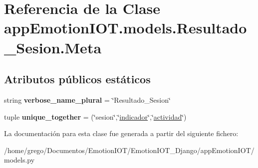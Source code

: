 \hypertarget{classappEmotionIOT_1_1models_1_1Resultado__Sesion_1_1Meta}{}\section{Referencia de la Clase app\+Emotion\+I\+O\+T.\+models.\+Resultado\+\_\+\+Sesion.\+Meta}
\label{classappEmotionIOT_1_1models_1_1Resultado__Sesion_1_1Meta}
\subsection*{Atributos públicos estáticos}
\begin{DoxyCompactItemize}
\item 
string {\bfseries verbose\+\_\+name\+\_\+plural} = \char`\"{}Resultado\+\_\+\+Sesion\char`\"{}\hypertarget{classappEmotionIOT_1_1models_1_1Resultado__Sesion_1_1Meta_ab5a90370e4be72d3a06878342aae7341}{}\label{classappEmotionIOT_1_1models_1_1Resultado__Sesion_1_1Meta_ab5a90370e4be72d3a06878342aae7341}

\item 
tuple {\bfseries unique\+\_\+together} = (\char`\"{}sesion\char`\"{},\char`\"{}\hyperlink{classappEmotionIOT_1_1models_1_1Resultado__Sesion_a3986bb0d23cd17ed1bf907337427ad04}{indicador}\char`\"{},\char`\"{}\hyperlink{classappEmotionIOT_1_1models_1_1Resultado__Sesion_a534d7c093517470292866ce9ca9d914f}{actividad}\char`\"{})\hypertarget{classappEmotionIOT_1_1models_1_1Resultado__Sesion_1_1Meta_a7e5b03e4f9b1fc776f3da102243a3ecc}{}\label{classappEmotionIOT_1_1models_1_1Resultado__Sesion_1_1Meta_a7e5b03e4f9b1fc776f3da102243a3ecc}

\end{DoxyCompactItemize}


La documentación para esta clase fue generada a partir del siguiente fichero\+:\begin{DoxyCompactItemize}
\item 
/home/grego/\+Documentos/\+Emotion\+I\+O\+T/\+Emotion\+I\+O\+T\+\_\+\+Django/app\+Emotion\+I\+O\+T/models.\+py\end{DoxyCompactItemize}

